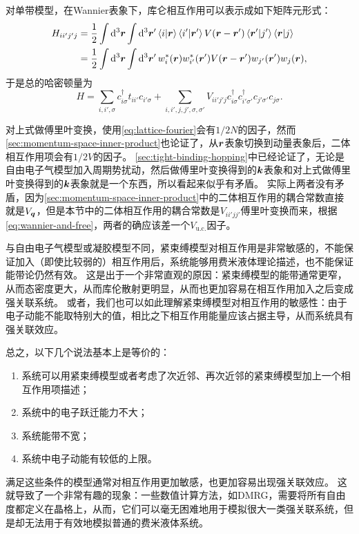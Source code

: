 对单带模型，在Wannier表象下，库仑相互作用可以表示成如下矩阵元形式：
\begin{equation}
    \begin{aligned}
        H_{i i' j' j} &= \frac{1}{2} \int \dd[3]{\vb*{r}} \int \dd[3]{\vb*{r}'} \braket{i}{\vb*{r}} \braket{i'}{\vb*{r}'} V(\vb*{r} - \vb*{r}') \braket{\vb*{r}'}{j'} \braket{\vb*{r}}{j} \\
        &= \frac{1}{2} \int \dd[3]{\vb*{r}} \int \dd[3]{\vb*{r}'} w_i^*(\vb*{r}) w_{i'}^*(\vb*{r}') V(\vb*{r} - \vb*{r}') w_{j'}(\vb*{r}') w_j(\vb*{r}),
    \end{aligned}
    \label{eq:wannier-basis-interaction}
\end{equation}
于是总的哈密顿量为
\begin{equation}
    H = \sum_{i, i', \sigma} c^\dagger_{i \sigma} t_{i i'} c_{i' \sigma} + \sum_{i, i', j, j', \sigma, \sigma'} V_{i i' j' j} c^\dagger_{i \sigma} c^\dagger_{i' \sigma'} c_{j' \sigma'} c_{j \sigma}.
\end{equation}

对上式做傅里叶变换，使用\eqref{eq:lattice-fourier}会有$1/2N$的因子，然而\autoref{sec:momentum-space-inner-product}也论证了，从$\vb*{r}$表象切换到动量表象后，二体相互作用项会有$1/2V$的因子。
\autoref{sec:tight-binding-hopping}中已经论证了，无论是自由电子气模型加入周期势扰动，然后做傅里叶变换得到的$\vb*{k}$表象和对上式做傅里叶变换得到的$\vb*{k}$表象就是一个东西，所以看起来似乎有矛盾。
实际上两者没有矛盾，因为\autoref{sec:momentum-space-inner-product}中的二体相互作用的耦合常数直接就是$V_{\vb*{q}}$，但是本节中的二体相互作用的耦合常数是$V_{i i' j j'}$傅里叶变换而来，根据\eqref{eq:wannier-and-free}，两者的确应该差一个$V_\text{u.c.}$因子。

与自由电子气模型或凝胶模型不同，紧束缚模型对相互作用是非常敏感的，不能保证加入（即使比较弱的）相互作用后，系统能够用费米液体理论描述，也不能保证能带论仍然有效。
这是出于一个非常直观的原因：紧束缚模型的能带通常更窄，从而态密度更大，从而库伦散射更明显，从而也更加容易在相互作用加入之后变成强关联系统。
或者，我们也可以如此理解紧束缚模型对相互作用的敏感性：由于电子动能不能取特别大的值，相比之下相互作用能量应该占据主导，从而系统具有强关联效应。

总之，以下几个说法基本上是等价的：
\begin{enumerate}
    \item 系统可以用紧束缚模型或者考虑了次近邻、再次近邻的紧束缚模型加上一个相互作用项描述；
    \item 系统中的电子跃迁能力不大；
    \item 系统能带不宽；
    \item 系统中电子动能有较低的上限。
\end{enumerate}
满足这些条件的模型通常对相互作用更加敏感，也更加容易出现强关联效应。
这就导致了一个非常有趣的现象：一些数值计算方法，如DMRG，需要将所有自由度都定义在晶格上，从而，它们可以毫无困难地用于模拟很大一类强关联系统，但是却无法用于有效地模拟普通的费米液体系统。

